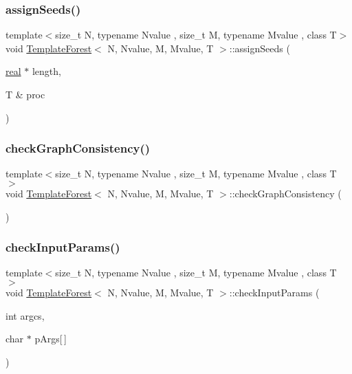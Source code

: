 \mbox{\label{classTemplateForest_ae2a665238333df093bece9ec5b40d1f1}} 
\subsubsection{\texorpdfstring{assign\+Seeds()}{assignSeeds()}}
{\footnotesize\ttfamily template$<$size\+\_\+t N, typename Nvalue , size\+\_\+t M, typename Mvalue , class T$>$ \\
void \mbox{\hyperlink{classTemplateForest}{Template\+Forest}}$<$ N, Nvalue, M, Mvalue, T $>$\+::assign\+Seeds (\begin{DoxyParamCaption}\item[{\mbox{\hyperlink{definitions_8h_aedc0ad84d1e764530814f57ad931d02a}{real}} $\ast$}]{length,  }\item[{T \&}]{proc }\end{DoxyParamCaption})}

\mbox{\label{classTemplateForest_a3d2daa1c271c51f027b114fe56e9322e}} 
\subsubsection{\texorpdfstring{check\+Graph\+Consistency()}{checkGraphConsistency()}}
{\footnotesize\ttfamily template$<$size\+\_\+t N, typename Nvalue , size\+\_\+t M, typename Mvalue , class T $>$ \\
void \mbox{\hyperlink{classTemplateForest}{Template\+Forest}}$<$ N, Nvalue, M, Mvalue, T $>$\+::check\+Graph\+Consistency (\begin{DoxyParamCaption}{ }\end{DoxyParamCaption})}

\mbox{\label{classTemplateForest_aae43950b8b41ac3cc1568f7966f84d15}} 
\subsubsection{\texorpdfstring{check\+Input\+Params()}{checkInputParams()}}
{\footnotesize\ttfamily template$<$size\+\_\+t N, typename Nvalue , size\+\_\+t M, typename Mvalue , class T $>$ \\
void \mbox{\hyperlink{classTemplateForest}{Template\+Forest}}$<$ N, Nvalue, M, Mvalue, T $>$\+::check\+Input\+Params (\begin{DoxyParamCaption}\item[{int}]{argcs,  }\item[{char $\ast$}]{p\+Args\mbox{[}$\,$\mbox{]} }\end{DoxyParamCaption})}

